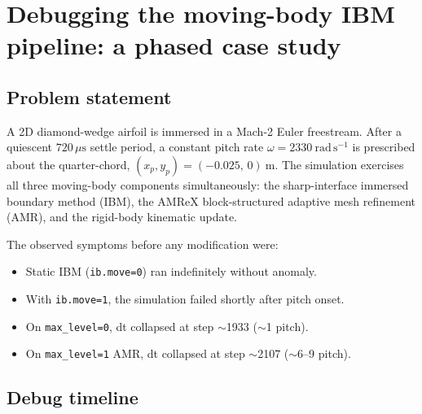 
\section{Debugging the moving-body IBM pipeline: a phased case study}
\label{sec:appendix-ibm-moving-v5}

\subsection{Problem statement}

A 2D diamond-wedge airfoil is immersed in a Mach-2 Euler freestream. After a
quiescent $720\,\mu\mathrm{s}$ settle period, a constant pitch rate
$\omega = 2330~\mathrm{rad\,s^{-1}}$ is prescribed about the quarter-chord,
$(x_p,y_p)=(-0.025,\,0)~\mathrm{m}$. The simulation exercises all three
moving-body components simultaneously: the sharp-interface immersed boundary
method (IBM), the AMReX block-structured adaptive mesh refinement (AMR), and
the rigid-body kinematic update.

The observed symptoms before any modification were:
\begin{itemize}
  \item Static IBM (\texttt{ib.move=0}) ran indefinitely without anomaly.
  \item With \texttt{ib.move=1}, the simulation failed shortly after pitch
        onset.
  \item On \texttt{max\_level=0}, dt collapsed at step $\sim$1933
        ($\sim$1\textdegree{} pitch).
  \item On \texttt{max\_level=1} AMR, dt collapsed at step $\sim$2107
        ($\sim$6--9\textdegree{} pitch).
\end{itemize}

\subsection{Debug timeline}

